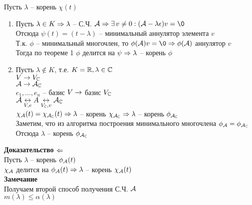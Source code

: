 \documentclass[12pt]{article}
\begin{document}
Пусть $\lambda$ -- корень $\chi(t)$
\begin{enumerate}
    \item Пусть $\lambda \in K \Rightarrow \lambda$ -- С.Ч. $\mcA \Rto \ex v \neq 0: (\mcA - \lambda \epsilon)v = \0$\\
    Отсюда $\psi(t) = (t-\lambda)$ -- минимальный аннулятор элемента $v$\\
    Т.к. $\phi$ -- минимальный многочлен, то $\phi(\mcA) v = \0 \Rto \phi(\mcA)$ аннулятор $v$\\
    Тогда по теореме 1 $\phi$ делится на $\psi \Rightarrow \lambda$ -- корень $\phi$
    \item Пусть $\lambda \not\in K$, т.е. $K = \mathbb{R}, \lambda \in \mathbb{C}$\\
    $V \rightarrow V_\mathbb{C}$\\
    $\mathcal{A} \rightarrow \mathcal{A}_\mathbb{C}$\\
    $e_1, \ldots, e_n$ -- базис $V \rightarrow$ базис $V_\mathbb{C}$\\
    $\mathcal{A} \underset{V, e}{\leftrightarrow} A \underset{V_\mathbb{C}, v} {\leftrightarrow} \mathcal{A}_\mathbb{C}$\\
    $\chi_\mathcal{A}(t) = \chi_{\mathcal{A}_\mathbb{C}}(t) \Rightarrow \lambda$ -- корень $\chi_{\mathcal{A}_\mathbb{C}} \Rightarrow \lambda$ -- корень $\phi_{\mathcal{A}_\mathbb{C}}$\\
    Заметим, что из алгоритма построения минимального многочлена $\phi_\mathcal{A} = \phi_{\mathcal{A}_\mathbb{C}}$\\
    Отсюда $\lambda$ -- корень $\phi_{\mathcal{A}_\mathbb{C}}$
\end{enumerate}
\textbf{Доказательство $\Leftarrow$}\\
Пусть $\lambda$ -- корень $\phi_\mathcal{A}(t)$\\
$\chi_\mathcal{A}$ делится на $\phi_\mathcal{A}(t) \Rightarrow \lambda$ -- корень $\chi_\mathcal{A}(t)$\\
\textbf{Замечание}\\
Получаем второй способ получения С.Ч. $\mathcal{A}$\\
$m(\lambda) \leq \alpha(\lambda)$
\end{document}
